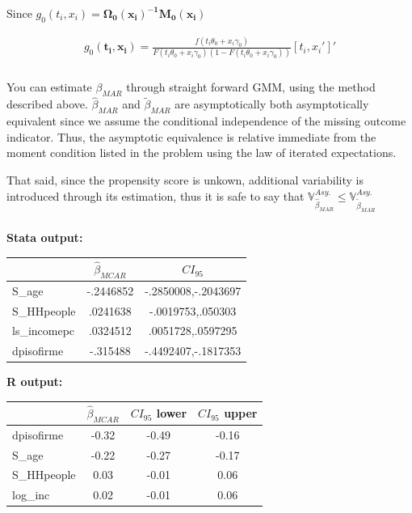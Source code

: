\documentclass[12pt]{article}
\newcommand{\V}{\mathbb{V}}
\begin{document}
Since $g_0(t_i,x_i) =  \mathbf{\Omega_0(x_i)^{-1}M_0(x_i)}$

\begin{align*}
  g_0\mathbf{(t_i,x_i)} = \frac{f(t_i\theta_0 + x_i\gamma_0)}{F(t_i \theta_0 + x_i\gamma_0)(1 - F(t_i \theta_0 + x_i\gamma_0))} [t_i,x_i']'
\end{align*}



\subsubsection{}


You can estimate $\beta_{MAR}$ through straight forward GMM, using the method described above. $\hat\beta_{MAR}$ and $\tilde\beta_{MAR}$ are asymptotically both asymptotically equivalent since we assume the conditional independence of the missing outcome indicator. Thus, the asymptotic equivalence is relative immediate from the moment condition listed in the problem using the law of iterated expectations.

That said, since the propensity score is unkown, additional variability is introduced through its estimation, thus it is safe to say that $\V^{Asy.} _{\hat\beta_{MAR}} \leq \V^{Asy.} _{\tilde\beta_{MAR}}$

\subsubsection{}
\textbf{Stata output:}\\

\begin{tabular}{lcc}
\hline
&           $\hat \beta_{MCAR}$ &     $CI_{95}$\\
\hline
S\_age       &   -.2446852 &-.2850008,-.2043697\\
S\_HHpeople  &    .0241638 &-.0019753,.050303\\
ls\_incomepc &    .0324512 &.0051728,.0597295\\
dpisofirme  &    -.315488 &-.4492407,-.1817353\\
\hline
\end{tabular}

\vspace{1cm}
\textbf{R output:}\\
\begin{tabular}{lccc}
  \hline
  & $\hat \beta_{MCAR}$  & $CI_{95}$ lower & $CI_{95}$ upper \\
  \hline
dpisofirme & -0.32  & -0.49 & -0.16  \\
  S\_age & -0.22 & -0.27 & -0.17 \\
  S\_HHpeople & 0.03  & -0.01 & 0.06 \\
  log\_inc & 0.02 &  -0.01 & 0.06 \\
   \hline
\end{tabular}
\end{document}
